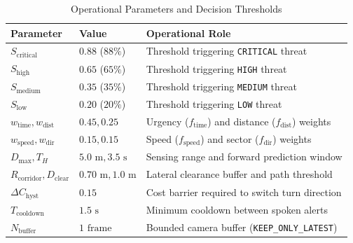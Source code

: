 \begin{table}[t]
\caption{Operational Parameters and Decision Thresholds}
\label{tab:thresholds}
\centering
\footnotesize
\setlength{\tabcolsep}{3pt}
\begin{tabularx}{\columnwidth}{p{1.8cm}p{1.6cm}X}
\toprule
\textbf{Parameter} & \textbf{Value} & \textbf{Operational Role} \\
\midrule
$S_{\text{critical}}$ & $0.88$ ($88\%$) & Threshold triggering \texttt{CRITICAL} threat \\
$S_{\text{high}}$ & $0.65$ ($65\%$) & Threshold triggering \texttt{HIGH} threat \\
$S_{\text{medium}}$ & $0.35$ ($35\%$) & Threshold triggering \texttt{MEDIUM} threat \\
$S_{\text{low}}$ & $0.20$ ($20\%$) & Threshold triggering \texttt{LOW} threat \\
$w_{\text{time}}, w_{\text{dist}}$ & $0.45, 0.25$ & Urgency ($f_{\text{time}}$) and distance ($f_{\text{dist}}$) weights \\
$w_{\text{speed}}, w_{\text{dir}}$ & $0.15, 0.15$ & Speed ($f_{\text{speed}}$) and sector ($f_{\text{dir}}$) weights \\
$D_{\max}, T_H$ & $5.0\text{ m}, 3.5\text{ s}$ & Sensing range and forward prediction window \\
$R_{\text{corridor}}, D_{\text{clear}}$ & $0.70\text{ m}, 1.0\text{ m}$ & Lateral clearance buffer and path threshold \\
$\Delta C_{\text{hyst}}$ & $0.15$ & Cost barrier required to switch turn direction \\
$T_{\text{cooldown}}$ & $1.5\text{ s}$ & Minimum cooldown between spoken alerts \\
$N_{\text{buffer}}$ & $1\text{ frame}$ & Bounded camera buffer (\texttt{KEEP\_ONLY\_LATEST}) \\
\bottomrule
\end{tabularx}
\end{table}
